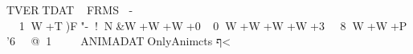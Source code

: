 TVER   TDAT                    FRMS                              	- 	        1W+T)F"-      !N&W+W+W+0    0W+W+W+W+3      8W+W+P'6         @1              	            ANIMADAT   OnlyAnim cts\Flares{}\MagentaGl
ף<       
